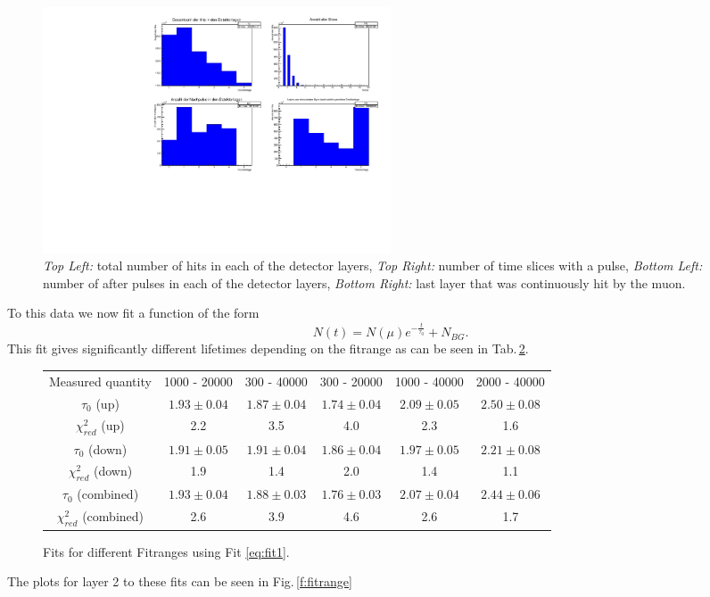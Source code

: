 \begin{figure}[H]
\centering
\includegraphics[width=0.5\textwidth]{figures/Weiteres_Plot.pdf}
\caption{\emph{Top Left:} total number of hits in each of the detector layers, \emph{Top Right:} number of time slices with a pulse, \emph{Bottom Left:} number of after pulses in each of the detector layers, \emph{Bottom Right:} last layer that was continuously hit by the muon. }
\label{f:Weiteres}
\end{figure}


To this data we now fit a function of the form
\begin{equation} \label{eq:fit1}
	N(t)=N(\mu)e^{-\frac{t}{\tau_0}}+N_{BG}.
\end{equation}
This fit gives significantly different lifetimes depending on the fitrange as can be seen in Tab.\,\ref{t:lebensdauer}.
\begin{figure}[H]
\begin{tabularx}{\textwidth}{| c | c | c | c | c | c |}
Measured quantity & 1000 - 20000 & 300 - 40000 & 300 - 20000 & 1000 - 40000 & 2000 - 40000\\
$\tau_0$ (up) & $1.93\pm 0.04$ & $1.87\pm0.04$ & $1.74\pm0.04$ & $2.09\pm0.05$ & $2.50\pm0.08$ \\
$\chi^2_{red}$ (up) & 2.2 & 3.5 & 4.0 & 2.3 & 1.6 \\
$\tau_0$ (down) & $1.91 \pm 0.05$ & $1.91\pm0.04$ & $1.86\pm0.04$ & $1.97\pm0.05$ & $2.21\pm0.08$ \\
$\chi^2_{red}$ (down) & 1.9 & 1.4 & 2.0 & 1.4 & 1.1 \\
$\tau_0$ (combined) & $1.93\pm0.04$ & $1.88\pm 0.03$ & $1.76\pm0.03$ & $2.07 \pm0.04$ & $2.44\pm0.06$ \\
$\chi^2_{red}$ (combined) & 2.6 & 3.9 & 4.6 & 2.6 & 1.7 
\end{tabularx}
\caption{Fits for different Fitranges using Fit \ref{eq:fit1}.}
\label{t:lebensdauer}
\end{figure}
The plots for layer 2 to these fits can be seen in Fig.\,\ref{f:fitrange}

